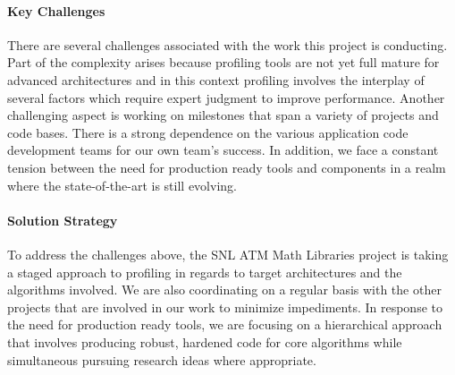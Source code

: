 \paragraph{Key  Challenges}
There are several challenges associated with the work this project is conducting. Part of the complexity arises because profiling tools are not yet full mature for advanced architectures and in this context profiling involves the interplay of several factors which require expert judgment to improve performance.  Another challenging aspect is working on milestones that span a variety of projects and code bases. There is a strong dependence on the various application code development teams for our own team's success. In addition, we face a constant tension between the need for production ready tools and components in a realm where the state-of-the-art is still evolving.

\paragraph{Solution Strategy}
To address the challenges above, the SNL ATM Math Libraries project is taking a staged approach to profiling in regards to target architectures and the algorithms involved. We are also coordinating on a regular basis with the other projects that are involved in our work to minimize impediments. In response to the need for production ready tools, we are focusing on a hierarchical approach that involves producing robust, hardened code for core algorithms while simultaneous pursuing research ideas where appropriate.

